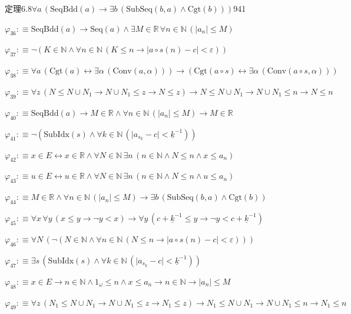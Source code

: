 \begin{fullproof}{定理6.8}{$\forall a\,(\mathrm{SeqBdd}(a) \to \exists b\,(\mathrm{SubSeq}(b,a) \land \mathrm{Cgt}(b)))$}{941}
\begin{abbrevlist}
\item $\varphi_{36} :\equiv \mathrm{SeqBdd}(a) \to \mathrm{Seq}(a) \land \exists M \in \mathbb{R}\,\forall n \in \mathbb{N}\,(\lvert a_{n} \rvert \leq M)$
\item $\varphi_{37} :\equiv \neg (K \in \mathbb{N} \land \forall n \in \mathbb{N}\,(K \leq n \to \lvert a \circ s(n) - c \rvert < \varepsilon))$
\item $\varphi_{38} :\equiv \forall a\,(\mathrm{Cgt}(a) \leftrightarrow \exists \alpha\,(\mathrm{Conv}(a,\alpha))) \to (\mathrm{Cgt}(a \circ s) \leftrightarrow \exists \alpha\,(\mathrm{Conv}(a \circ s,\alpha)))$
\item $\varphi_{39} :\equiv \forall z\,(N \leq N \cup N_{1} \to N \cup N_{1} \leq z \to N \leq z) \to N \leq N \cup N_{1} \to N \cup N_{1} \leq n \to N \leq n$
\item $\varphi_{40} :\equiv \mathrm{SeqBdd}(a) \to M \in \mathbb{R} \land \forall n \in \mathbb{N}\,(\lvert a_{n} \rvert \leq M) \to M \in \mathbb{R}$
\item $\varphi_{41} :\equiv \neg (\mathrm{SubIdx}(s) \land \forall k \in \mathbb{N}\,(\lvert a_{s_{k}} - c \rvert < \underline{k}^{-1}))$
\item $\varphi_{42} :\equiv x \in E \leftrightarrow x \in \mathbb{R} \land \forall N \in \mathbb{N}\,\exists n\,(n \in \mathbb{N} \land N \leq n \land x \leq a_{n})$
\item $\varphi_{43} :\equiv u \in E \leftrightarrow u \in \mathbb{R} \land \forall N \in \mathbb{N}\,\exists n\,(n \in \mathbb{N} \land N \leq n \land u \leq a_{n})$
\item $\varphi_{44} :\equiv M \in \mathbb{R} \land \forall n \in \mathbb{N}\,(\lvert a_{n} \rvert \leq M) \to \exists b\,(\mathrm{SubSeq}(b,a) \land \mathrm{Cgt}(b))$
\item $\varphi_{45} :\equiv \forall x\,\forall y\,(x \leq y \to \neg y < x) \to \forall y\,(c + \underline{k}^{-1} \leq y \to \neg y < c + \underline{k}^{-1})$
\item $\varphi_{46} :\equiv \forall N\,(\neg (N \in \mathbb{N} \land \forall n \in \mathbb{N}\,(N \leq n \to \lvert a \circ s(n) - c \rvert < \varepsilon)))$
\item $\varphi_{47} :\equiv \exists s\,(\mathrm{SubIdx}(s) \land \forall k \in \mathbb{N}\,(\lvert a_{s_{k}} - c \rvert < \underline{k}^{-1}))$
\item $\varphi_{48} :\equiv x \in E \to n \in \mathbb{N} \land 1_{\omega} \leq n \land x \leq a_{n} \to n \in \mathbb{N} \to \lvert a_{n} \rvert \leq M$
\item $\varphi_{49} :\equiv \forall z\,(N_{1} \leq N \cup N_{1} \to N \cup N_{1} \leq z \to N_{1} \leq z) \to N_{1} \leq N \cup N_{1} \to N \cup N_{1} \leq n \to N_{1} \leq n$

\end{abbrevlist}
\end{fullproof}
